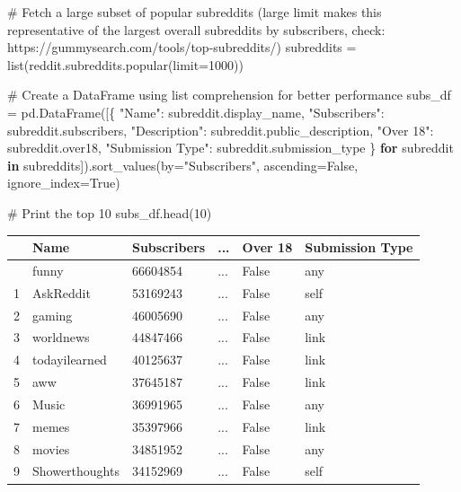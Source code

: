 \documentclass[
  12pt,
  letterpaper,
  DIV=11,
  numbers=noendperiod]{scrartcl}
\newenvironment{Shaded}{\begin{snugshade}}{\end{snugshade}}
\newcommand{\BuiltInTok}[1]{\textcolor[rgb]{0.00,0.23,0.31}{#1}}
\newcommand{\CommentTok}[1]{\textcolor[rgb]{0.37,0.37,0.37}{#1}}
\newcommand{\ControlFlowTok}[1]{\textcolor[rgb]{0.00,0.23,0.31}{\textbf{#1}}}
\newcommand{\DecValTok}[1]{\textcolor[rgb]{0.68,0.00,0.00}{#1}}
\newcommand{\KeywordTok}[1]{\textcolor[rgb]{0.00,0.23,0.31}{\textbf{#1}}}
\newcommand{\NormalTok}[1]{\textcolor[rgb]{0.00,0.23,0.31}{#1}}
\newcommand{\OperatorTok}[1]{\textcolor[rgb]{0.37,0.37,0.37}{#1}}
\newcommand{\StringTok}[1]{\textcolor[rgb]{0.13,0.47,0.30}{#1}}
\newcommand{\VariableTok}[1]{\textcolor[rgb]{0.07,0.07,0.07}{#1}}
\begin{document}
\begin{Shaded}
\begin{Highlighting}[]
\CommentTok{\# Fetch a large subset of popular subreddits (large limit makes this representative of the largest overall subreddits by subscribers, check: https://gummysearch.com/tools/top{-}subreddits/)}
\NormalTok{subreddits }\OperatorTok{=} \BuiltInTok{list}\NormalTok{(reddit.subreddits.popular(limit}\OperatorTok{=}\DecValTok{1000}\NormalTok{))}

\CommentTok{\# Create a DataFrame using list comprehension for better performance}
\NormalTok{subs\_df }\OperatorTok{=}\NormalTok{ pd.DataFrame([\{}
    \StringTok{"Name"}\NormalTok{: subreddit.display\_name,}
    \StringTok{"Subscribers"}\NormalTok{: subreddit.subscribers,}
    \StringTok{"Description"}\NormalTok{: subreddit.public\_description,}
    \StringTok{"Over 18"}\NormalTok{: subreddit.over18,}
    \StringTok{"Submission Type"}\NormalTok{: subreddit.submission\_type}
\NormalTok{\} }\ControlFlowTok{for}\NormalTok{ subreddit }\KeywordTok{in}\NormalTok{ subreddits]).sort\_values(by}\OperatorTok{=}\StringTok{"Subscribers"}\NormalTok{, ascending}\OperatorTok{=}\VariableTok{False}\NormalTok{, ignore\_index}\OperatorTok{=}\VariableTok{True}\NormalTok{)}

\CommentTok{\# Print the top 10}
\NormalTok{subs\_df.head(}\DecValTok{10}\NormalTok{)}
\end{Highlighting}
\end{Shaded}

\begin{longtable}[]{@{}llllll@{}}
\toprule\noalign{}
& Name & Subscribers & ... & Over 18 & Submission Type \\
\midrule\noalign{}
\endhead
\bottomrule\noalign{}
\endlastfoot
0 & funny & 66604854 & ... & False & any \\
1 & AskReddit & 53169243 & ... & False & self \\
2 & gaming & 46005690 & ... & False & any \\
3 & worldnews & 44847466 & ... & False & link \\
4 & todayilearned & 40125637 & ... & False & link \\
5 & aww & 37645187 & ... & False & link \\
6 & Music & 36991965 & ... & False & any \\
7 & memes & 35397966 & ... & False & link \\
8 & movies & 34851952 & ... & False & any \\
9 & Showerthoughts & 34152969 & ... & False & self \\
\end{longtable}
\end{document}
